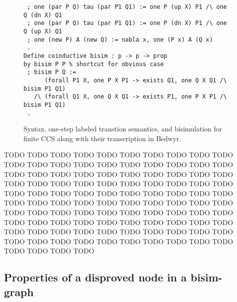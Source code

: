 \documentclass{llncs}
\begin{document}
\begin{figure}
\begin{lstlisting}
 ; one (par P Q) tau (par P1 Q1) := one P (up X) P1 /\ one Q (dn X) Q1
 ; one (par P Q) tau (par P1 Q1) := one P (dn X) P1 /\ one Q (up X) Q1
 ; one (new P) A (new Q) := nabla x, one (P x) A (Q x)
 .
Define coinductive bisim : p -> p -> prop
by bisim P P % shortcut for obvious case
 ; bisim P Q :=
      (forall P1 X, one P X P1 -> exists Q1, one Q X Q1 /\ bisim P1 Q1)
   /\ (forall Q1 X, one Q X Q1 -> exists P1, one P X P1 /\ bisim P1 Q1)
 .
\end{lstlisting}
\vspace*{-2ex}
\caption{Syntax, one-step labeled transtion semantics, and bisimulation
  for finite CCS along with their transcription in Bedwyr.}
\label{fig:ccsdef}
\end{figure}

TODO TODO TODO TODO TODO TODO TODO TODO TODO TODO TODO TODO TODO
TODO TODO TODO TODO TODO TODO TODO TODO TODO TODO TODO TODO TODO
TODO TODO TODO TODO TODO TODO TODO TODO TODO TODO TODO TODO TODO
TODO TODO TODO TODO TODO TODO TODO TODO TODO TODO TODO TODO TODO
TODO TODO TODO TODO TODO TODO TODO TODO TODO TODO TODO TODO TODO
TODO TODO TODO TODO TODO TODO TODO TODO TODO TODO TODO TODO TODO
TODO TODO TODO TODO TODO TODO TODO TODO TODO TODO TODO TODO TODO
TODO TODO TODO TODO TODO TODO TODO TODO TODO TODO TODO TODO TODO

\subsection{Properties of a disproved node in a bisim-graph}
\end{document}
